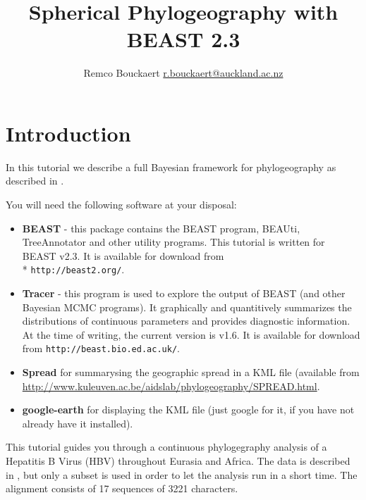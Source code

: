 \documentclass{article}
\newcommand{\BEASTVersion}{2.3}
\newcommand{\TracerVersion}{1.6}
\newcommand{\FigTreeVersion}{1.4.2}
\begin{document}
    \title{Spherical Phylogeography with BEAST \BEASTVersion}
\author{Remco Bouckaert \url{r.bouckaert@auckland.ac.nz}}
\maketitle

\section{Introduction}


In this tutorial we describe a full Bayesian framework for phylogeography as described in  \cite{sphericalgeo}.
 
You will need the following software at your disposal:

\begin{itemize}

\item {\bf BEAST} - this package contains the BEAST program, BEAUti, TreeAnnotator and other utility programs. This tutorial is written for BEAST v{\BEASTVersion}. It is available for download from \\* \texttt{http://beast2.org/}.
\item {\bf Tracer} - this program is used to explore the output of BEAST (and other Bayesian MCMC programs). It graphically and
quantitively summarizes the distributions of continuous parameters and provides diagnostic information. At the time of
writing, the current version is v{\TracerVersion}. It is available for download from \texttt{http://beast.bio.ed.ac.uk/}.
\item {\bf Spread} for summarysing the geographic spread in a KML file (available from \url{http://www.kuleuven.ac.be/aidslab/phylogeography/SPREAD.html}.
\item {\bf google-earth} for displaying the KML file (just google for it, if you have not already have it installed).
\end{itemize}


This tutorial guides you through a continuous phylogegraphy analysis of a Hepatitis B Virus (HBV) throughout Eurasia and Africa. The data is described in \cite{sphericalgeo}, but only a subset is used in order to let the analysis run in a short time. The alignment consists of 17 sequences of  3221 characters.
\end{document}
